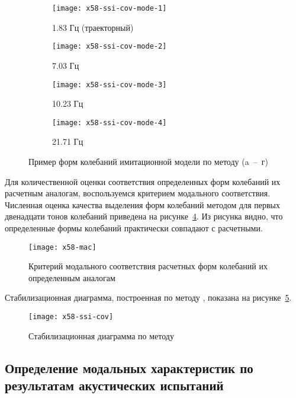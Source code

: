 \def\sfX58{0.48\textwidth}

\begin{figure}[!htb]
	\centering
	\begin{subfigure}[b]{\sfX58}
		\texttt{[image: x58-ssi-cov-mode-1]}
		\caption{1.83 Гц (траекторный)} \label{subfig:x58-ssi-cov-mode-1}
	\end{subfigure}
	\hfill
	\begin{subfigure}[b]{\sfX58}
		\texttt{[image: x58-ssi-cov-mode-2]}
		\caption{7.03 Гц}
	\end{subfigure}
	\begin{subfigure}[b]{\sfX58}
		\texttt{[image: x58-ssi-cov-mode-3]}
		\caption{10.23 Гц}
	\end{subfigure}	
	\hfill
	\begin{subfigure}[b]{\sfX58}
		\texttt{[image: x58-ssi-cov-mode-4]}
		\caption{21.71 Гц} \label{subfig:x58-ssi-cov-mode-4}
	\end{subfigure}	
	\caption{Пример форм колебаний имитационной модели по методу  (a~--~г)}
\end{figure}

Для количественной оценки соответствия определенных форм колебаний их расчетным аналогам, воспользуемся критерием модального соответствия. Численная оценка качества выделения форм колебаний методом  для первых двенадцати тонов колебаний приведена на рисунке~\ref{fig:x58-mac}. Из рисунка видно, что определенные формы колебаний практически совпадают с расчетными.

\begin{figure}[!htb]
	\centerfloat
	\texttt{[image: x58-mac]}
	\caption{Критерий модального соответствия расчетных форм колебаний их определенным аналогам} \label{fig:x58-mac}
\end{figure}

Стабилизационная диаграмма, построенная по методу , показана на рисунке~\ref{fig:x58-ssi-cov}.

\begin{figure}[H]
	\centerfloat
	\texttt{[image: x58-ssi-cov]}
	\caption{Стабилизационная диаграмма по методу } \label{fig:x58-ssi-cov}
\end{figure}

\subsection{Определение модальных характеристик по результатам акустических испытаний}

